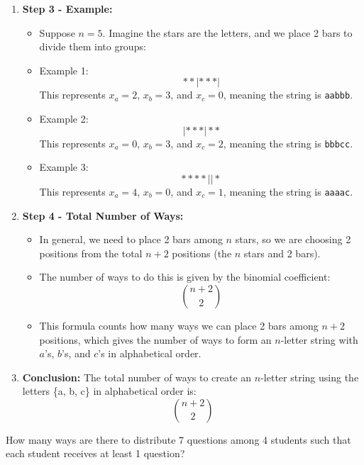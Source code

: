 \begin{example}
\begin{enumerate}
            \item \textbf{Step 3 - Example:} 
            \begin{itemize}
                \item Suppose $n = 5$. Imagine the stars are the letters, and we place 2 bars to divide them into groups:
                \item Example 1: 
                \[
                **|***| 
                \]
                This represents $x_a = 2$, $x_b = 3$, and $x_c = 0$, meaning the string is \texttt{aabbb}.
                \item Example 2: 
                \[
                |***|**
                \]
                This represents $x_a = 0$, $x_b = 3$, and $x_c = 2$, meaning the string is \texttt{bbbcc}.
                \item Example 3: 
                \[
                ****||*
                \]
                This represents $x_a = 4$, $x_b = 0$, and $x_c = 1$, meaning the string is \texttt{aaaac}.
            \end{itemize}
            
            \item \textbf{Step 4 - Total Number of Ways:}
            \begin{itemize}
                \item In general, we need to place 2 bars among $n$ stars, so we are choosing 2 positions from the total $n + 2$ positions (the $n$ stars and 2 bars).
                \item The number of ways to do this is given by the binomial coefficient:
                \[
                \binom{n+2}{2}
                \]
                \item This formula counts how many ways we can place 2 bars among $n + 2$ positions, which gives the number of ways to form an $n$-letter string with $a$'s, $b$'s, and $c$'s in alphabetical order.
            \end{itemize}
            
            \item \textbf{Conclusion:} The total number of ways to create an $n$-letter string using the letters \{a, b, c\} in alphabetical order is:
            \[
            \binom{n+2}{2}
            \]
        \end{enumerate}
    \end{example}

    \begin{example}
        How many ways are there to distribute 7 questions among 4 students such that each student receives at least 1 question?
    \end{example}

